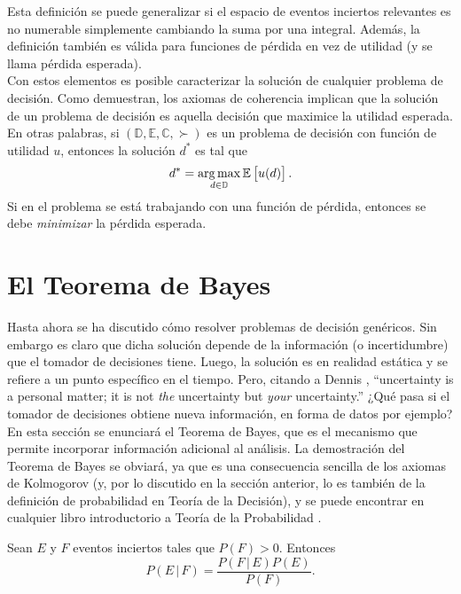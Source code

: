 Esta definición se puede generalizar si el espacio de eventos inciertos relevantes es no numerable simplemente cambiando la suma por una integral. Además, la definición también es válida para funciones de pérdida en vez de utilidad (y se llama pérdida esperada).\\

Con estos elementos es posible caracterizar la solución de cualquier problema de decisión. Como \cite[Capítulo~2.5]{bernardo_smith} demuestran, los axiomas de coherencia implican que la solución de un problema de decisión es aquella decisión que maximice la utilidad esperada. En otras palabras, si $( \mathbb{D}, \mathbb{E}, \mathbb{C}, \succ )$ es un problema de decisión con función de utilidad $u$, entonces la solución $d^*$ es tal que
\begin{equation}\label{max_utilidad_esperada}
d^* = \operatorname*{arg\,max}_{d \in \mathbb{D}} \mathbb{E} \left[ u(d) \right].
\end{equation}
Si en el problema se está trabajando con una función de pérdida, entonces se debe \textit{minimizar} la pérdida esperada.


\section{El Teorema de Bayes}

Hasta ahora se ha discutido cómo resolver problemas de decisión genéricos. Sin embargo es claro que dicha solución depende de la información (o incertidumbre) que el tomador de decisiones tiene. Luego, la solución es en realidad estática y se refiere a un punto específico en el tiempo. Pero, citando a Dennis \cite{lindley_uncertainty}, ``uncertainty is a personal matter; it is not \textit{the} uncertainty but \textit{your} uncertainty.'' ¿Qué pasa si el tomador de decisiones obtiene nueva información, en forma de datos por ejemplo? En esta sección se enunciará el Teorema de Bayes, que es el mecanismo que permite incorporar información adicional al análisis. La demostración del Teorema de Bayes se obviará, ya que es una consecuencia sencilla de los axiomas de Kolmogorov (y, por lo discutido en la sección anterior, lo es también de la definición de probabilidad en Teoría de la Decisión), y se puede encontrar en cualquier libro introductorio a Teoría de la Probabilidad \citep[por~ejemplo][]{ross_probability}.

\begin{theorem}[de Bayes]
Sean $E$ y $F$ eventos inciertos tales que ${P(F) > 0}$. Entonces
\begin{equation}\label{teo_bayes1}
P(E \, | \, F) = \frac{P(F \, | \, E) P(E)}{P(F)}.
\end{equation}
\end{theorem}

